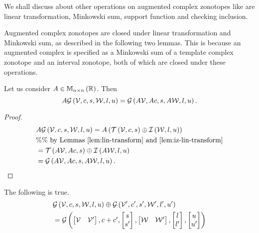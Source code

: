 We shall discuss about other operations on augmented complex zonotopes
like are linear transformation, Minkowski sum, support function and
checking inclusion.

Augmented complex zonotopes are closed under linear transformation and
Minkowski sum, as described in the following two lemmas.  This
is because an augmented complex is specified as a Minkowski sum of a template
complex zonotope and an interval zonotope, both of which are closed
under these operations.
%
\begin{lemma}
Let us consider $A\in\mathbb{M}_{n\times n}\left(\mathbb{R}\right)$.  Then
%
\[
A\mathcal{G}\left(\mathcal{V},c,s,\mathcal{W},l,u\right)=\mathcal{G}\left(A\mathcal{V},Ac,s,A\mathcal{W},l,u\right).
\]
%
\end{lemma}
%
\begin{proof}
  \begin{align*}
    & A\mathcal{G}\left(\mathcal{V},c,s,\mathcal{W},l,u\right)=
    A\left(\mathit{\operatorname{\mathcal{T}}}\left(\mathcal{V},c,s\right)\oplus \mathit{\operatorname{\mathcal{I}}}\left(\mathcal{W},l,u\right)\right)\\
    & \%\%~\text{by Lemmas~\ref{lem:lin-transform} and~\ref{lem:iz-lin-transform}}\\
    &
    = \mathit{\operatorname{\mathcal{T}}}\left(A\mathcal{V},Ac,s\right)\oplus \mathit{\operatorname{\mathcal{I}}}\left(A\mathcal{W},l,u\right)\\
    & = \mathcal{G}\left(A\mathcal{V},Ac,s,A\mathcal{W},l,u\right).~~~~~~~~~~~~~\qedhere
  \end{align*}
\end{proof}
%
\begin{lemma}
The following is true.
%
\begin{align*}
& \mathcal{G}\left(\mathcal{V},c,s,\mathcal{W},l,u\right)\oplus \mathcal{G}\left(\mathcal{V}^\prime,c^\prime,s^\prime,\mathcal{W}^\prime,l^\prime,u^\prime\right)\\
& = \mathcal{G}\left(\left[\begin{matrix}
    \mathcal{V} &
    \mathcal{V}^\prime
  \end{matrix}\right]
,\begin{matrix}
    c+c^\prime
  \end{matrix}
,\left[\begin{matrix}
    s\\
    s^\prime
  \end{matrix}\right]
,\left[\begin{matrix}
    \mathcal{W} &
    \mathcal{W}^\prime
  \end{matrix}\right]
,\left[\begin{matrix}
    l\\
    l^\prime
  \end{matrix}\right]
,\left[\begin{matrix}
    u\\
    u^\prime
  \end{matrix}\right]
\right)
\end{align*}
%
\end{lemma}
